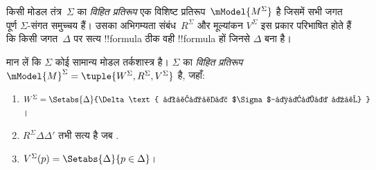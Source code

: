 \documentclass[../../../include/open-logic-section]{subfiles}
\begin{document}


किसी मोडल तंत्र~$\Sigma$ का \emph{विहित प्रतिरूप} एक विशिष्ट
प्रतिरूप~$\mModel{M^\Sigma}$ है जिसमें सभी जगत पूर्ण $\Sigma$-संगत
समुच्चय हैं। उसका अभिगम्यता संबंध~$R^\Sigma$ और मूल्यांकन $V^\Sigma$ इस
प्रकार परिभाषित होते हैं कि किसी जगत~$\Delta$ पर सत्य !!{formula} ठीक वही
!!{formula} हों जिनसे $\Delta$ बना है।

\begin{defn}
  मान लें कि $\Sigma$ कोई सामान्य मोडल तर्कशास्त्र है। $\Sigma$ का
  \emph{विहित प्रतिरूप} $\mModel{M}^\Sigma = \tuple{W^\Sigma,
    R^\Sigma, V^\Sigma}$ है, जहाँ:
  \begin{enumerate}
  \item $W^\Sigma = \Setabs{ \Delta }{\Delta \text{
      पूर्ण $\Sigma$-संगत है} }$।
  \item $R^\Sigma \Delta\Delta'$ तभी सत्य है जब
    .
  \item $V^\Sigma(p) = \Setabs{\Delta}{p \in \Delta}$।
  \end{enumerate}
\end{defn}
\end{document}
